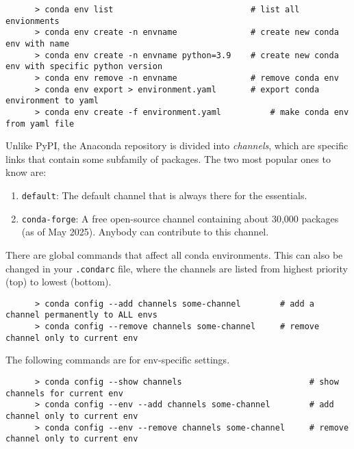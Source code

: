   \begin{example}
    \begin{lstlisting}
      > conda env list                            # list all envionments
      > conda env create -n envname               # create new conda env with name 
      > conda env create -n envname python=3.9    # create new conda env with specific python version
      > conda env remove -n envname               # remove conda env
      > conda env export > environment.yaml       # export conda environment to yaml 
      > conda env create -f environment.yaml          # make conda env from yaml file 
    \end{lstlisting}
  \end{example}

  Unlike PyPI, the Anaconda repository is divided into \textit{channels}, which are specific links that contain some subfamily of packages. The two most popular ones to know are: 
  \begin{enumerate}
    \item \texttt{default}: The default channel that is always there for the essentials. 
    \item \texttt{conda-forge}: A free open-source channel containing about 30,000 packages (as of May 2025). Anybody can contribute to this channel. 
  \end{enumerate} 

  \begin{example}
    There are global commands that affect all conda environments. This can also be changed in your \texttt{.condarc} file, where the channels are listed from highest priority (top) to lowest (bottom). 
    \begin{lstlisting}
      > conda config --add channels some-channel        # add a channel permanently to ALL envs 
      > conda config --remove channels some-channel     # remove channel only to current env 
    \end{lstlisting}

    The following commands are for env-specific settings. 
    \begin{lstlisting}
      > conda config --show channels                          # show channels for current env
      > conda config --env --add channels some-channel        # add channel only to current env 
      > conda config --env --remove channels some-channel     # remove channel only to current env 
    \end{lstlisting}
  \end{example} 
  
